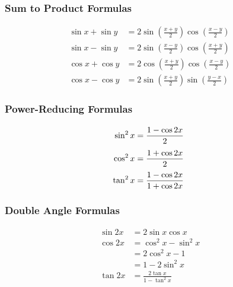 \noindent%
\begin{minipage}[t]{.44\linewidth}
\subsubsection*{Sum to Product Formulas}\vspace{-\baselineskip}
\begin{align*}
\sin x+\sin y &= 2\sin (\tfrac{x+y}2)\cos(\tfrac{x-y}2) &~\\
\sin x-\sin y &= 2\sin (\tfrac{x-y}2)\cos(\tfrac{x+y}2) \\
\cos x+\cos y &= 2\cos (\tfrac{x+y}2)\cos(\tfrac{x-y}2) \\
\cos x-\cos y &= 2\sin (\tfrac{x+y}2)\sin(\tfrac{y-x}2)
\end{align*}
\end{minipage}%
\begin{minipage}[t]{.3\linewidth}
\subsubsection*{Power-Reducing Formulas}\vspace{-\baselineskip}
\begin{align*}
\sin^2 x &= \frac{1-\cos 2x}{2} & \vphantom{\left(\frac11\right)}&~\\
\cos^2 x &= \frac{1+\cos 2x}{2} & \vphantom{\left(\frac11\right)}\\
\tan^2 x &= \frac{1-\cos 2x}{1+\cos 2x}
\end{align*}
\end{minipage}%
\begin{minipage}[t]{.25\linewidth}
	\subsubsection*{Double Angle Formulas}\vspace{-\baselineskip}
	\begin{align*}
		\sin 2x &= 2\sin x\cos x &~\\
		\cos 2x &= \cos^2x - \sin^2 x \\
		&= 2\cos^2x-1 \\
		&= 1-2\sin^2x \\
		\tan 2x &= \frac{2\tan x}{1-\tan^2 x}
	\end{align*}
\end{minipage}

\vfill

